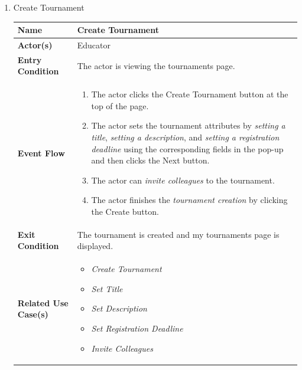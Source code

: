 \begin{enumerate}
\newpage


\item Create Tournament
\begin{center}
    \begin{tabular}{ | m{10em} | m{10cm}| } 
      \hline
      \textbf{Name} & Create Tournament  \\ 
      \hline
      \textbf{Actor(s)} & Educator \\ 
      \hline
      \textbf{Entry Condition} & The actor is viewing the tournaments page. \\ 
      \hline
      \textbf{Event Flow} & 
          \begin{enumerate}[(1)]
              \item The actor clicks the Create Tournament button at the top of the page.
              \item The actor sets the tournament attributes by \textit{setting a title}, \textit{setting a description}, and \textit{setting a registration deadline} using the corresponding fields in the pop-up and then clicks the Next button.
              \item The actor can \textit{invite colleagues} to the tournament.
              \item The actor finishes the \textit{tournament creation} by clicking the Create button.
          \end{enumerate}
      \\ 
      \hline
      \textbf{Exit Condition} & The tournament is created and my tournaments page is displayed.  \\ 
      \hline
      \textbf{Related Use Case(s)} & 
      \begin{itemize}
          \item \textit{Create Tournament}
          \item \textit{Set Title}
          \item \textit{Set Description}
          \item \textit{Set Registration Deadline}
          \item \textit{Invite Colleagues}
      \end{itemize}
          \\ 
      \hline
    \end{tabular}
\end{center}



\newpage


\end{enumerate}
